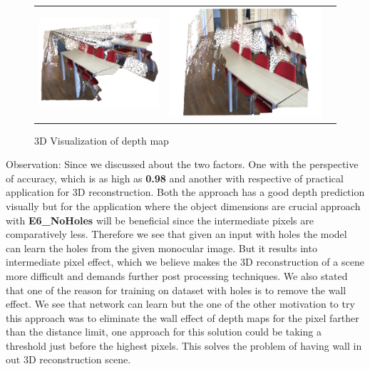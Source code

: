  \begin{figure}[!]
%
\centering\begin{tabular}{c@{ }c@{ }c@{ }}
\includegraphics[width=.5\linewidth]{Figures/results/3D/holes001.png}&
\includegraphics[width=.5\linewidth]{Figures/results/3D/noholes002.png}\\[-1ex]
\end{tabular}
\caption{3D Visualization of depth map}
\label{fig:3drecon}
\end{figure}

Observation: Since we discussed about the two factors. One with the perspective of accuracy, which is as high as \textbf{0.98} and another with respective of practical application for 3D reconstruction. Both the approach has a good depth prediction visually but for the application where the object dimensions are crucial approach with \textbf{E6\_NoHoles} will be beneficial since the intermediate pixels are comparatively less. 
Therefore we see that given an input with holes the model can learn the holes from the given monocular image. But it results into intermediate pixel effect, which we believe makes the 3D reconstruction of a scene more difficult and demands further post processing techniques. We also stated that one of the reason for training on dataset with holes is to remove the wall effect. We see that network can learn but the one of the other motivation to try this approach was to eliminate the wall effect of depth maps  for the pixel farther than the distance limit, one approach for this solution could be taking a threshold just before the highest pixels. This solves the problem of having wall in out 3D reconstruction scene.\\



